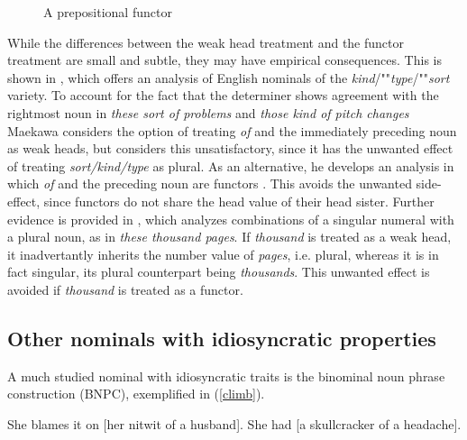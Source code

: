 \documentclass[output=paper]{langsci/langscibook}
\begin{document}
\begin{figure}
	\centering
{}
	\caption{\label{beau} A prepositional functor}
\end{figure}

While the differences between the weak head treatment and the functor treatment are small and subtle, 
they may have empirical consequences. This is shown in \citet{Maekawa15}, which offers 
an analysis of English nominals of the \emph{kind}/""\emph{type}/""\emph{sort} variety.  
To account for the fact that the determiner shows agreement with the 
rightmost noun in \emph{these sort of problems} and \emph{those kind of pitch changes}
Maekawa considers the option of treating \emph{of} and the immediately preceding noun as 
weak heads, but considers this unsatisfactory, since it has the unwanted effect of treating 
\emph{sort/kind/type} as plural. As an alternative, he develops an analysis in which \emph{of} and 
the preceding noun are functors \citep[149]{Maekawa15}. This avoids the unwanted side-effect, 
since functors do not share the {\sc head} value of their head sister. 
Further evidence is provided in \citet{Maekawa16}, which analyzes combinations of a   
singular numeral with a plural noun, as in \emph{these thousand pages}. If 
\emph{thousand} is treated as a weak head, it inadvertantly inherits the number value of
\emph{pages}, i.e. plural, whereas it is in fact singular, its plural counterpart being 
\emph{thousands}. This unwanted effect is avoided if \emph{thousand} is treated as a functor.


\subsection{Other nominals with idiosyncratic properties} 


A much studied nominal with idiosyncratic traits is the binominal noun phrase 
construction (BNPC), exemplified in (\ref{climb}). 

\begin{exe}
\ex\label{climb}
\begin{xlist}
\ex  She blames it on [her nitwit of a husband]. 
\ex  She had [a skullcracker of a headache]. 
\end{xlist}
\end{exe}
\end{document}
